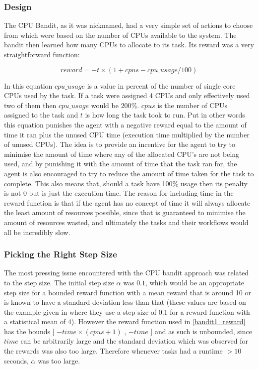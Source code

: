\subsubsection{Design}
\label{subsub:bandit1_design}

The CPU Bandit, as it was nicknamed, had a very simple set of actions to choose from which were based on the number of CPUs available to the system. The bandit then learned how many CPUs to allocate to its task. Its reward was a very straightforward function:

\begin{equation}
\label{bandit1_reward}
reward = -t\times(1+cpus - cpu\_usage/100)
\end{equation}


In this equation $cpu\_usage$ is a value in percent of the number of single core CPUs used by the task. If a task were assigned 4 CPUs and only effectively used two of them then $cpu\_usage$ would be $200$\%. $cpus$ is the number of CPUs assigned to the task and $t$ is how long the task took to run. Put in other words this equation punishes the agent with a negative reward equal to the amount of time it ran plus the unused CPU time (execution time multiplied by the number of unused CPUs). The idea is to provide an incentive for the agent to try to minimise the amount of time where any of the allocated CPU’s are not being used, and by punishing it with the amount of time that the task ran for, the agent is also encouraged to try to reduce the amount of time taken for the task to complete. This also means that, should a task have 100\% usage then its penalty is not 0 but is just the execution time. The reason for including time in the reward function is that if the agent has no concept of time it will always allocate the least amount of resources possible, since that is guaranteed to minimise the amount of resources wasted, and ultimately the tasks and their workflows would all be incredibly slow. 

\subsubsection{Picking the Right Step Size}
\label{subsub:const_stepsize}
The most pressing issue encountered with the CPU bandit approach was related to the step size. The initial step size $\alpha$ was $0.1$, which would be an appropriate step size for a bounded reward function with a mean reward that is around 10 or is known to have a standard deviation less than that (these values are based on the example given in \cite{sutton_barto} where they use a step size of 0.1 for a reward function with a statistical mean of 4). However the reward function used in \ref{bandit1_reward} has the bounds [ $-time \times (cpus+1)$ , $-time$ ] and as such is unbounded, since $time$ can be arbitrarily large and the standard deviation which was observed for the rewards was also too large. Therefore whenever tasks had a runtime $> 10$ seconds, $\alpha$ was too large. 

